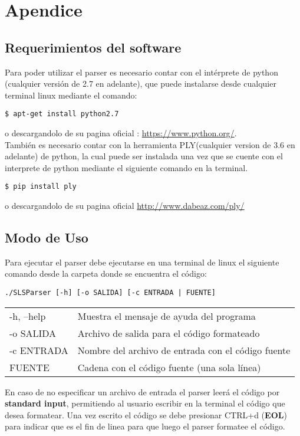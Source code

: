 \section{Apendice}

\subsection{Requerimientos del software}
Para poder utilizar el parser es necesario contar con el intérprete de python
(cualquier versión de 2.7 en adelante), que puede instalarse desde cualquier
terminal linux mediante el comando:

\begin{verbatim}
$ apt-get install python2.7
\end{verbatim}

o descargandolo de su pagina oficial : \url{https://www.python.org/}. \\
También es necesario contar con la herramienta PLY(cualquier version de 3.6 en
adelante) de python, la cual puede ser
instalada una vez que se cuente con el interprete de python mediante el siguiente comando en la terminal.
\begin{verbatim}
$ pip install ply
\end{verbatim}
o descargandolo de su pagina oficial \url{http://www.dabeaz.com/ply/}

\subsection{Modo de Uso}
Para ejecutar el parser debe ejecutarse en una terminal de linux el siguiente
comando desde la carpeta donde se encuentra el código:
\begin{verbatim}
./SLSParser [-h] [-o SALIDA] [-c ENTRADA | FUENTE]
\end{verbatim}

\begin{tabular}{ll}
     -h, --help    &  Muestra el mensaje de ayuda del programa \\
     -o SALIDA     &  Archivo de salida para el código formateado \\
     -c ENTRADA    &  Nombre del archivo de entrada con el código fuente \\
     FUENTE        &  Cadena con el código fuente (una sola línea)
\end{tabular}

En caso de no
especificar un archivo de entrada el parser leerá el código por \textbf{standard input},
permitiendo al usuario escribir en la terminal el código que desea formatear. Una vez escrito
el código se debe presionar CTRL+d (\textbf{EOL}) para indicar que es el fin de linea para que
luego el parser formatee el código.


